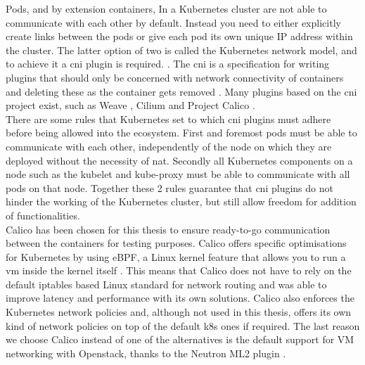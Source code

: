 Pods, and by extension containers, In a Kubernetes cluster are not able to communicate with each other by default. Instead you need to either explicitly create links between the pods or give each pod its own unique IP address within the cluster. The latter option of two is called the Kubernetes network model, and to achieve it a \acrfull{cni} plugin is required. \cite{k8scni} \cite{k8snetworkmodel}. The \acrshort{cni} is a specification for writing plugins that should only be concerned with network connectivity of containers and deleting these as the container gets removed \cite{cni}. Many plugins based on the \acrshort{cni} project exist, such as Weave \cite{weave}, Cilium \cite{cilium} and Project Calico \cite{calico}.
\\[10pt]

There are some rules that Kubernetes set to which \acrshort{cni} plugins must adhere before being allowed into the ecosystem. First and foremost pods must be able to communicate with each other, independently of the node on which they are deployed without the necessity of \acrfull{nat}. Secondly all Kubernetes components on a node such as the kubelet and kube-proxy must be able to communicate with all pods on that node. Together these 2 rules guarantee that \acrshort{cni} plugins do not hinder the working of the Kubernetes cluster, but still allow freedom for addition of functionalities.
\\[10pt]

Calico has been chosen for this thesis to ensure ready-to-go communication between the containers for testing purposes. Calico offers specific optimisations for Kubernetes by using eBPF, a Linux kernel feature that allows you to run a \acrshort{vm} inside the kernel itself \cite{ebpf}. This means that Calico does not have to rely on the default iptables based Linux standard for network routing and was able to improve latency and performance with its own solutions. Calico also enforces the Kubernetes network policies and, although not used in this thesis, offers its own kind of network policies on top of the default \acrshort{k8s} ones if required. The last reason we choose Calico instead of one of the alternatives is the default support for VM networking with Openstack, thanks to the Neutron ML2 plugin \cite{neutron}. 


